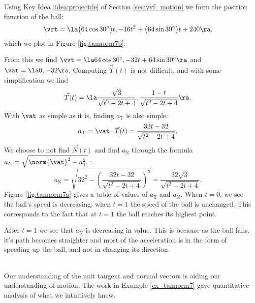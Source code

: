 {Using Key Idea \ref{idea:projectile} of Section \ref{sec:vvf_motion} we form the position function of the ball:
\[
\vrt = \la \big(64\cos 30^\circ\big)t, -16t^2+\big(64\sin 30^\circ\big)t+240\ra,
\]
which we plot in Figure \ref{fig:tannorm7b}.

From this we find $\vvt = \la 64\cos 30^\circ, -32t+64\sin 30^\circ\ra$ and $\vat = \la 0,-32\ra$. Computing $\vec T(t)$ is not difficult, and with some simplification we find
\[
\vec T(t) = \la \frac{\sqrt{3}}{\sqrt{t^2-2t+4}}, \frac{1-t}{\sqrt{t^2-2t+4}}\ra.
\]
With $\vat$ as simple as it is, finding $a_\text{T}$ is also  simple:
\[
a_\text{T} = \vat\cdot \vec T(t) = \frac{32t-32}{\sqrt{t^2-2t+4}}.
\]
We choose to not find $\vec N(t)$ and find $a_\text{N}$ through the formula $a_\text{N} = \sqrt{\norm{\vat}^2-a_\text{T}^2\,}$\,:
\[
a_\text{N} = \sqrt{32^2-\left(\frac{32t-32}{\sqrt{t^2-2t+4}}\right)^2} = \frac{32\sqrt{3}}{\sqrt{t^2-2t+4}}.
\]
Figure \ref{fig:tannorm7a} gives a table of values of $a_\text{T}$ and $a_\text{N}$. When $t=0$, we see the ball's speed is decreasing; when $t=1$ the speed of the ball is unchanged. This corresponds to the fact that at $t=1$ the ball reaches its highest point.

After $t=1$ we see that $a_\text{N}$ is decreasing in value. This is because as the ball falls, it's path becomes straighter and most of the acceleration is in the form of speeding up the ball, and not in changing its direction.
}\\

Our understanding of the unit tangent and normal vectors is aiding our understanding of motion. The work in Example \ref{ex_tannorm7} gave quantitative analysis of what we intuitively knew.

